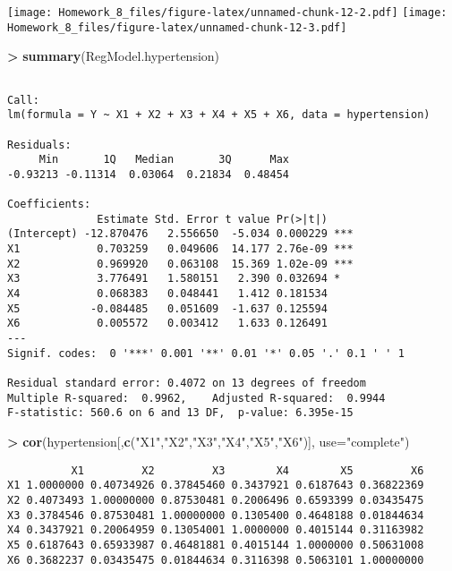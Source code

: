 \documentclass[]{article}
\newenvironment{Shaded}{\begin{snugshade}}{\end{snugshade}}
\newcommand{\KeywordTok}[1]{\textcolor[rgb]{0.13,0.29,0.53}{\textbf{#1}}}
\newcommand{\DataTypeTok}[1]{\textcolor[rgb]{0.13,0.29,0.53}{#1}}
\newcommand{\StringTok}[1]{\textcolor[rgb]{0.31,0.60,0.02}{#1}}
\newcommand{\OperatorTok}[1]{\textcolor[rgb]{0.81,0.36,0.00}{\textbf{#1}}}
\newcommand{\NormalTok}[1]{#1}
\begin{document}
\texttt{[image: Homework\_8\_files/figure-latex/unnamed-chunk-12-2.pdf]}
\texttt{[image: Homework\_8\_files/figure-latex/unnamed-chunk-12-3.pdf]}

\begin{Shaded}
\begin{Highlighting}[]
\OperatorTok{>}\StringTok{ }\KeywordTok{summary}\NormalTok{(RegModel.hypertension)}
\end{Highlighting}
\end{Shaded}

\begin{verbatim}

Call:
lm(formula = Y ~ X1 + X2 + X3 + X4 + X5 + X6, data = hypertension)

Residuals:
     Min       1Q   Median       3Q      Max 
-0.93213 -0.11314  0.03064  0.21834  0.48454 

Coefficients:
              Estimate Std. Error t value Pr(>|t|)    
(Intercept) -12.870476   2.556650  -5.034 0.000229 ***
X1            0.703259   0.049606  14.177 2.76e-09 ***
X2            0.969920   0.063108  15.369 1.02e-09 ***
X3            3.776491   1.580151   2.390 0.032694 *  
X4            0.068383   0.048441   1.412 0.181534    
X5           -0.084485   0.051609  -1.637 0.125594    
X6            0.005572   0.003412   1.633 0.126491    
---
Signif. codes:  0 '***' 0.001 '**' 0.01 '*' 0.05 '.' 0.1 ' ' 1

Residual standard error: 0.4072 on 13 degrees of freedom
Multiple R-squared:  0.9962,    Adjusted R-squared:  0.9944 
F-statistic: 560.6 on 6 and 13 DF,  p-value: 6.395e-15
\end{verbatim}

\begin{Shaded}
\begin{Highlighting}[]
\OperatorTok{>}\StringTok{ }\KeywordTok{cor}\NormalTok{(hypertension[,}\KeywordTok{c}\NormalTok{(}\StringTok{"X1"}\NormalTok{,}\StringTok{"X2"}\NormalTok{,}\StringTok{"X3"}\NormalTok{,}\StringTok{"X4"}\NormalTok{,}\StringTok{"X5"}\NormalTok{,}\StringTok{"X6"}\NormalTok{)], }\DataTypeTok{use=}\StringTok{"complete"}\NormalTok{)}
\end{Highlighting}
\end{Shaded}

\begin{verbatim}
          X1         X2         X3        X4        X5         X6
X1 1.0000000 0.40734926 0.37845460 0.3437921 0.6187643 0.36822369
X2 0.4073493 1.00000000 0.87530481 0.2006496 0.6593399 0.03435475
X3 0.3784546 0.87530481 1.00000000 0.1305400 0.4648188 0.01844634
X4 0.3437921 0.20064959 0.13054001 1.0000000 0.4015144 0.31163982
X5 0.6187643 0.65933987 0.46481881 0.4015144 1.0000000 0.50631008
X6 0.3682237 0.03435475 0.01844634 0.3116398 0.5063101 1.00000000
\end{verbatim}
\end{document}

